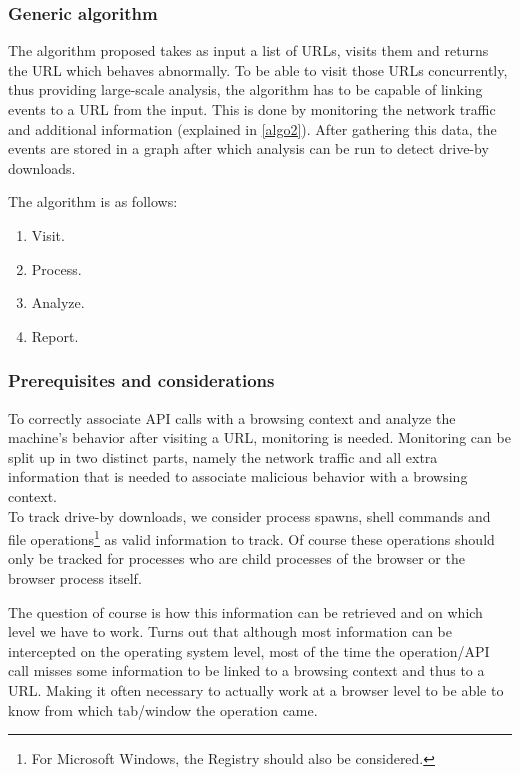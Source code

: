 
\subsubsection{Generic algorithm}

The algorithm proposed takes as input a list of URLs, visits them and returns the URL which behaves abnormally. To be able to visit those URLs concurrently, thus providing large-scale analysis, the algorithm has to be capable of linking events to a URL from the input. This is done by monitoring the network traffic and additional information (explained in \ref{algo2}). After gathering this data, the events are stored in a graph after which analysis can be run to detect drive-by downloads.

The algorithm is as follows:

\begin{enumerate}
\item Visit.
\item Process.
\item Analyze.
\item Report.
\end{enumerate}

\subsubsection{Prerequisites and considerations}

To correctly associate API calls with a browsing context and analyze the machine's behavior after visiting a URL, monitoring is needed. Monitoring can be split up in two distinct parts, namely the network traffic and all extra information that is needed to associate malicious behavior with a browsing context.\\

To track drive-by downloads, we consider process spawns, shell commands and file operations\footnote{For Microsoft Windows, the Registry should also be considered.} as valid information to track. Of course these operations should only be tracked for processes who are child processes of the browser or the browser process itself.\\

The question of course is how this information can be retrieved and on which level we have to work. Turns out that although most information can be intercepted on the operating system level, most of the time the operation/API call misses some information to be linked to a browsing context and thus to a URL. Making it often necessary to actually work at a browser level to be able to know from which tab/window the operation came.\\%

